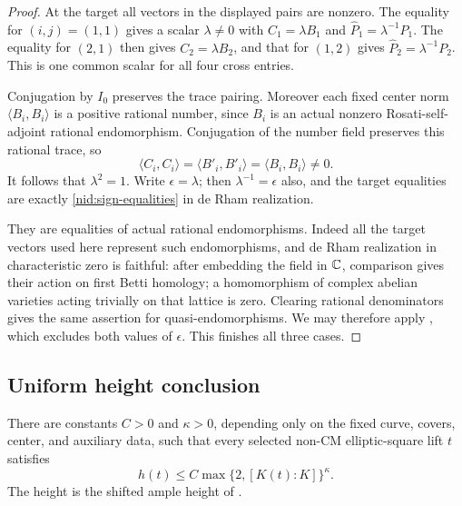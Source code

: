 \begin{proof}
At the target all vectors in the displayed pairs are nonzero.
The equality for $(i,j)=(1,1)$ gives a scalar $\lambda\ne0$ with
$C_1=\lambda B_1$ and
$\widehat P_1=\lambda^{-1}P_1$.  The equality for $(2,1)$ then gives
$C_2=\lambda B_2$, and that for $(1,2)$ gives
$\widehat P_2=\lambda^{-1}P_2$.  This is one common scalar for all four
cross entries.

Conjugation by $I_0$ preserves the trace pairing.  Moreover each fixed
center norm $\langle B_i,B_i\rangle$ is a positive rational number,
since $B_i$ is an actual nonzero Rosati-self-adjoint rational
endomorphism.  Conjugation of the number field preserves this rational
trace, so
\[
 \langle C_i,C_i\rangle
  =\langle B'_i,B'_i\rangle
  =\langle B_i,B_i\rangle\ne0.
\]
It follows that $\lambda^2=1$.  Write $\epsilon=\lambda$; then
$\lambda^{-1}=\epsilon$ also, and the target equalities are exactly
\eqref{nid:sign-equalities} in de Rham realization.

They are equalities of actual rational endomorphisms.  Indeed all the
target vectors used here represent such endomorphisms, and de Rham
realization in characteristic zero is faithful: after embedding the
field in $\mathbb C$, comparison gives their action on first Betti homology;
a homomorphism of complex abelian varieties acting trivially on that
lattice is zero.  Clearing rational denominators gives the same
assertion for quasi-endomorphisms.  We may therefore apply
, which excludes both values of $\epsilon$.
This finishes all three cases.
\end{proof}

\subsection{Uniform height conclusion}

\begin{theorem}
\label{nid:height}
There are constants $C>0$ and $\kappa>0$, depending only on the fixed
curve, covers, center, and auxiliary data, such that every selected
non-CM elliptic-square lift $t$ satisfies
\begin{equation}
 \label{nid:height-bound}
 h(t)\le C\max\{2,[K(t):K]\}^{\kappa}.
\end{equation}
The height is the shifted ample height of .
\end{theorem}

